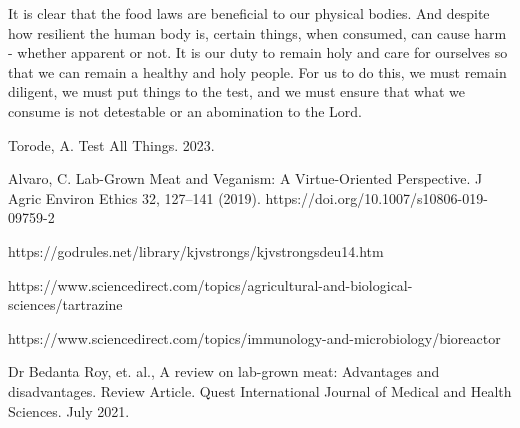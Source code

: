 \documentclass[10pt]{article}
\begin{document}
\begin{multicols}{2}
It is clear that the food laws are beneficial to our physical bodies. And despite how resilient the human body is, certain things, when consumed, can cause harm - whether apparent or not. It is our duty to remain holy and care for ourselves so that we can remain a healthy and holy people. For us to do this, we must remain diligent, we must put things to the test, and we must ensure that what we consume is not detestable or an abomination to the Lord.



\begin{thebibliography}{9}
	{\footnotesize
	 Torode, A. Test All Things. 2023.
	
	 Alvaro, C. Lab-Grown Meat and Veganism: A Virtue-Oriented Perspective. J Agric Environ Ethics 32, 127–141 (2019). https://doi.org/10.1007/s10806-019-09759-2
	
	 https://godrules.net/library/kjvstrongs/kjvstrongsdeu14.htm
	
	 https://www.sciencedirect.com/topics/agricultural-and-biological-sciences/tartrazine
	
	 https://www.sciencedirect.com/topics/immunology-and-microbiology/bioreactor
	
	 Dr Bedanta Roy, et. al., A review on lab-grown meat: Advantages and disadvantages. Review Article. Quest International Journal of Medical and Health Sciences. July 2021.
	}
\end{thebibliography}

\end{multicols}


\end{document}
